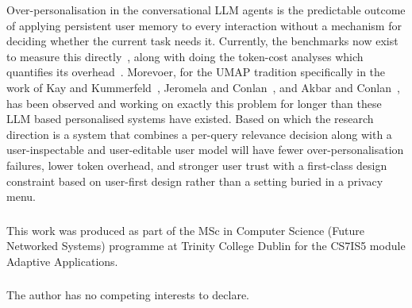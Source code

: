 \documentclass[runningheads]{llncs}
\begin{document}
Over-personalisation in the conversational LLM agents is the predictable outcome of applying persistent user memory to every interaction without a mechanism for deciding whether the current task needs it. Currently, the benchmarks now exist to measure this directly~\cite{opbench2026,rpeval2026}, along with doing the token-cost analyses which quantifies its overhead~\cite{du2025,anthropic_context}. Morevoer, for the UMAP tradition specifically in the work of Kay and Kummerfeld~\cite{kay2013}, Jeromela and Conlan~\cite{jeromela2024}, and Akbar and Conlan~\cite{akbar2024}, has been observed and working on exactly this problem for longer than these LLM based personalised systems have existed. Based on which the research direction is a system that combines a per-query relevance decision along with a user-inspectable and user-editable user model will have fewer over-personalisation failures, lower token overhead, and stronger user trust with a first-class design constraint based on user-first design rather than a setting buried in a privacy menu.

\begin{credits}
\subsubsection{\ackname} This work was produced as part of the MSc in Computer Science (Future Networked Systems) programme at Trinity College Dublin for the CS7IS5 module Adaptive Applications.

\subsubsection{\discintname} The author has no competing interests to declare.
\end{credits}



\end{document}
